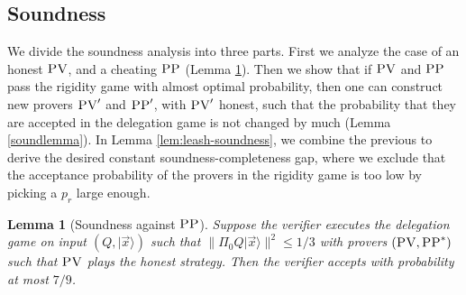 \documentclass[11pt,letter]{article}
\newtheorem{lemma}[theorem]{Lemma}
\theoremstyle{remark}
\theoremstyle{definition}
\newcommand{\ket}[1]{|#1\rangle}
\newcommand{\pv}{\textsc{PV}}
\newcommand{\pp}{\textsc{PP}}
\begin{document}
\subsection{Soundness}



We divide the soundness analysis into three parts. First we analyze the case of an honest $\pv$, and a cheating $\pp$ (Lemma \ref{lem:soundness-leash-pp}). Then we show that if $\pv$ and $\pp$ pass the rigidity game with almost optimal probability, then one can construct new provers $\pv'$ and $\pp'$, with $\pv'$ honest, such that the probability that they are accepted in the delegation game is not changed by much (Lemma \ref{soundlemma}). In Lemma \ref{lem:leash-soundness}, we combine the previous to derive the desired constant soundness-completeness gap, where we exclude that the acceptance probability of the provers in the rigidity game is too low by picking a $p_r$ large enough.


\begin{lemma}[Soundness against $\pp$]\label{lem:soundness-leash-pp}
Suppose the verifier executes the delegation  game on input $(Q,\ket{\vec{x}})$ such that $\|\Pi_0 Q\ket{\vec{x}}\|^2 \leq 1/3$ with provers $(\pv,\pp^*)$ such that $\pv$ plays the honest strategy. Then the verifier accepts with probability at most $7/9$. 
\end{lemma}
\end{document}
